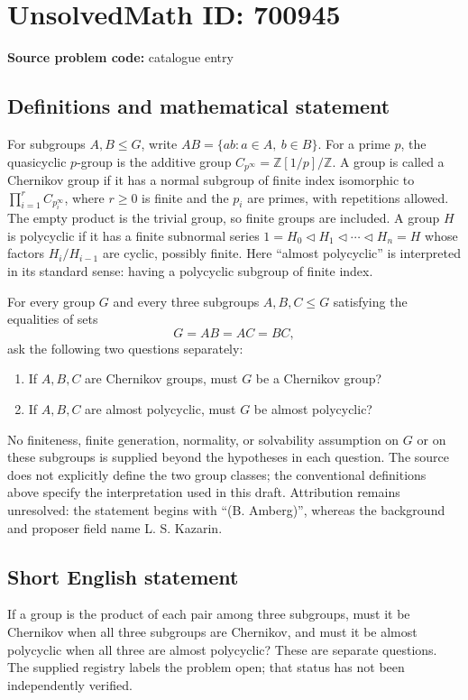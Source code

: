 \documentclass[11pt]{article}
\newcommand{\Z}{\mathbb{Z}}
\begin{document}
\section*{UnsolvedMath ID: 700945}
\textbf{Source problem code:} catalogue entry
\subsection{Definitions and mathematical statement}
For subgroups \(A,B\leq G\), write \(AB=\{ab:a\in A,\ b\in B\}\). For a prime \(p\), the quasicyclic \(p\)-group is the additive group \(C_{p^\infty}=\Z[1/p]/\Z\). A group is called a Chernikov group if it has a normal subgroup of finite index isomorphic to \(\prod_{i=1}^{r}C_{p_i^\infty}\), where \(r\geq 0\) is finite and the \(p_i\) are primes, with repetitions allowed. The empty product is the trivial group, so finite groups are included. A group \(H\) is polycyclic if it has a finite subnormal series \(1=H_0\triangleleft H_1\triangleleft\cdots\triangleleft H_n=H\) whose factors \(H_i/H_{i-1}\) are cyclic, possibly finite. Here ``almost polycyclic'' is interpreted in its standard sense: having a polycyclic subgroup of finite index.

For every group \(G\) and every three subgroups \(A,B,C\leq G\) satisfying the equalities of sets
\[
G=AB=AC=BC,
\]
ask the following two questions separately:
\begin{enumerate}
\item[(a)] If \(A,B,C\) are Chernikov groups, must \(G\) be a Chernikov group?
\item[(b)] If \(A,B,C\) are almost polycyclic, must \(G\) be almost polycyclic?
\end{enumerate}
No finiteness, finite generation, normality, or solvability assumption on \(G\) or on these subgroups is supplied beyond the hypotheses in each question. The source does not explicitly define the two group classes; the conventional definitions above specify the interpretation used in this draft. Attribution remains unresolved: the statement begins with ``(B. Amberg)'', whereas the background and proposer field name L. S. Kazarin.
\subsection{Short English statement}
If a group is the product of each pair among three subgroups, must it be Chernikov when all three subgroups are Chernikov, and must it be almost polycyclic when all three are almost polycyclic? These are separate questions. The supplied registry labels the problem open; that status has not been independently verified.
\end{document}
